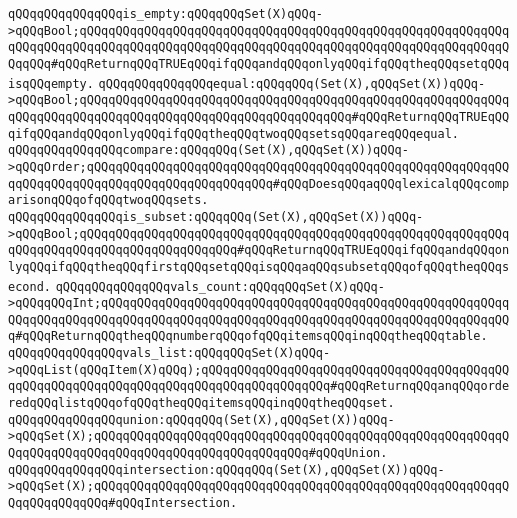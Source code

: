 \newline
\verb|qQQqqQQqqQQqqQQqis_empty:qQQqqQQqSet(X)qQQq->qQQqBool;qQQqqQQqqQQqqQQqqQQqqQQqqQQqqQQqqQQqqQQqqQQqqQQqqQQqqQQqqQQqqQQqqQQqqQQqqQQqqQQqqQQqqQQqqQQqqQQqqQQqqQQqqQQqqQQqqQQqqQQqqQQqqQQqqQQqqQQq#qQQqReturnqQQqTRUEqQQqifqQQqandqQQqonlyqQQqifqQQqtheqQQqsetqQQqisqQQqempty.|\newline
\newline
\verb|qQQqqQQqqQQqqQQqequal:qQQqqQQq(Set(X),qQQqSet(X))qQQq->qQQqBool;qQQqqQQqqQQqqQQqqQQqqQQqqQQqqQQqqQQqqQQqqQQqqQQqqQQqqQQqqQQqqQQqqQQqqQQqqQQqqQQqqQQqqQQqqQQqqQQqqQQqqQQqqQQq#qQQqReturnqQQqTRUEqQQqifqQQqandqQQqonlyqQQqifqQQqtheqQQqtwoqQQqsetsqQQqareqQQqequal.|\newline
\newline
\verb|qQQqqQQqqQQqqQQqcompare:qQQqqQQq(Set(X),qQQqSet(X))qQQq->qQQqOrder;qQQqqQQqqQQqqQQqqQQqqQQqqQQqqQQqqQQqqQQqqQQqqQQqqQQqqQQqqQQqqQQqqQQqqQQqqQQqqQQqqQQqqQQqqQQqqQQq#qQQqDoesqQQqaqQQqlexicalqQQqcomparisonqQQqofqQQqtwoqQQqsets.|\newline
\newline
\verb|qQQqqQQqqQQqqQQqis_subset:qQQqqQQq(Set(X),qQQqSet(X))qQQq->qQQqBool;qQQqqQQqqQQqqQQqqQQqqQQqqQQqqQQqqQQqqQQqqQQqqQQqqQQqqQQqqQQqqQQqqQQqqQQqqQQqqQQqqQQqqQQqqQQq#qQQqReturnqQQqTRUEqQQqifqQQqandqQQqonlyqQQqifqQQqtheqQQqfirstqQQqsetqQQqisqQQqaqQQqsubsetqQQqofqQQqtheqQQqsecond.|\newline
\newline
\verb|qQQqqQQqqQQqqQQqvals_count:qQQqqQQqSet(X)qQQq->qQQqqQQqInt;qQQqqQQqqQQqqQQqqQQqqQQqqQQqqQQqqQQqqQQqqQQqqQQqqQQqqQQqqQQqqQQqqQQqqQQqqQQqqQQqqQQqqQQqqQQqqQQqqQQqqQQqqQQqqQQqqQQqqQQqqQQqqQQq#qQQqReturnqQQqtheqQQqnumberqQQqofqQQqitemsqQQqinqQQqtheqQQqtable.|\newline
\newline
\verb|qQQqqQQqqQQqqQQqvals_list:qQQqqQQqSet(X)qQQq->qQQqList(qQQqItem(X)qQQq);qQQqqQQqqQQqqQQqqQQqqQQqqQQqqQQqqQQqqQQqqQQqqQQqqQQqqQQqqQQqqQQqqQQqqQQqqQQqqQQqqQQqqQQq#qQQqReturnqQQqanqQQqorderedqQQqlistqQQqofqQQqtheqQQqitemsqQQqinqQQqtheqQQqset.|\newline
\newline
\verb|qQQqqQQqqQQqqQQqunion:qQQqqQQq(Set(X),qQQqSet(X))qQQq->qQQqSet(X);qQQqqQQqqQQqqQQqqQQqqQQqqQQqqQQqqQQqqQQqqQQqqQQqqQQqqQQqqQQqqQQqqQQqqQQqqQQqqQQqqQQqqQQqqQQqqQQqqQQq#qQQqUnion.|\newline
\newline
\verb|qQQqqQQqqQQqqQQqintersection:qQQqqQQq(Set(X),qQQqSet(X))qQQq->qQQqSet(X);qQQqqQQqqQQqqQQqqQQqqQQqqQQqqQQqqQQqqQQqqQQqqQQqqQQqqQQqqQQqqQQqqQQqqQQq#qQQqIntersection.|\newline
